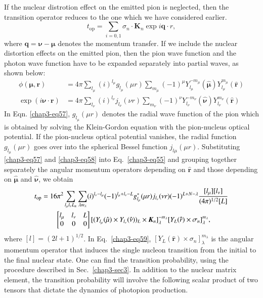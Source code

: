 If the nuclear distrotion effect on the emitted pion is neglected, then the transition operator reduces to the one which we have considered earlier.
\begin{equation}
t_{\text{op}} = \sum_{i=0, 1} \sigma_n \cdot {\boldsymbol K}_n \exp i {\boldsymbol q \cdot r}, \label{chap3-eq56}
\end{equation}
where $\boldsymbol{q}= \boldsymbol{\nu -\mu}$ denotes the momentum transfer. If we include the nuclear distortion effects on the emitted pion, then the pion wave function and the photon wave function have to be expanded separately into partial waves, as shown below:
\begin{align}
  \phi \boldsymbol{(\mu , r)} & = 4 \pi \sum_{l_{\mu}} (i)^{l_\mu} g_{l_\mu}(\mu r)\sum_{m_\mu} (-1)^\mu Y_{l_\mu}^{-m _\mu} ({\boldsymbol \hat{\mu}}) Y_{l_\mu}^{m_\mu} ({\boldsymbol \hat{r}}) \label{chap3-eq57}\\
  \exp (i \boldsymbol{\nu \cdot r}) & = 4 \pi \sum_{l_\nu} (i)^{l_\nu} j_{l_\nu} (\nu r) \sum_{m_\nu} (-1)^\nu Y_{l_\nu}^{-m_\nu} ({\boldsymbol \hat{\nu}}) Y_{l_\nu}^{m_\nu} ({\boldsymbol \hat{r}}) \label{chap3-eq58}
\end{align}
In Eqn. \eqref{chap3-eq57}, $g_{l_\mu} (\mu r)$ denotes the radial wave function of the pion which is obtained by solving the Klein-Gordon equation with the pion-nucleus optical potential. If the pion-nucleus optical potential vanishes, the radial function $g_{l_\mu}(\mu r)$ goes over into the spherical Bessel function  $j_{l\mu}(\mu r)$. Substituting \eqref{chap3-eq57} and \eqref{chap3-eq58} into Eq.~\eqref{chap3-eq55} and grouping together separately the angular momentum operators depending on ${\boldsymbol \hat{r}}$ and those depending on ${\boldsymbol \hat{\mu}}$ and ${\boldsymbol \hat{\nu}}$, we obtain
\eject
\begin{align}
  t_{\text{op}} & = 16\pi^2 \sum_{l_\mu l_\nu L_n} \sum_{\lambda m_\lambda} (i)^{l_\nu - l_\mu} (-1)^{l_\mu + l_\nu - L} g_{l_\mu}^\ast (\mu r)j_{l_\nu} (\nu r) (-1)^{L+N-\lambda} \frac{[l_\mu][l_\nu]}{(4 \pi)^{1/2}[L]}\notag\\
  & \qquad \begin{bmatrix} l_\mu & l_\nu & L\\ 0 & 0 & 0   \end{bmatrix} [(Y_{l_\mu}(\hat{\mu}) \times Y_{l_\nu} (\hat{\nu}))_L \times {\boldsymbol K}_n]_\lambda^{-m_\lambda} [Y_L ({\boldsymbol \hat{r}}) \times \sigma_n]_{\lambda}^{m_\lambda}, \label{chap3-eq59}
\end{align}
where $[l] = (2l+1)^{1/2}$. In Eq.\ \eqref{chap3-eq59}, $[Y_L ({\boldsymbol \hat{r}}) \times \sigma_n]_\lambda^{m_\lambda}$ is the angular momentum operator that induces the single nucleon transition from the initial to the final nuclear state. One can find the transition probability, using the procedure described in Sec.\ \ref{chap3-sec3}. In addition to the nuclear matrix element, the transition probability will involve the following scalar product of two tensors that dictate the dynamics of photopion production.
